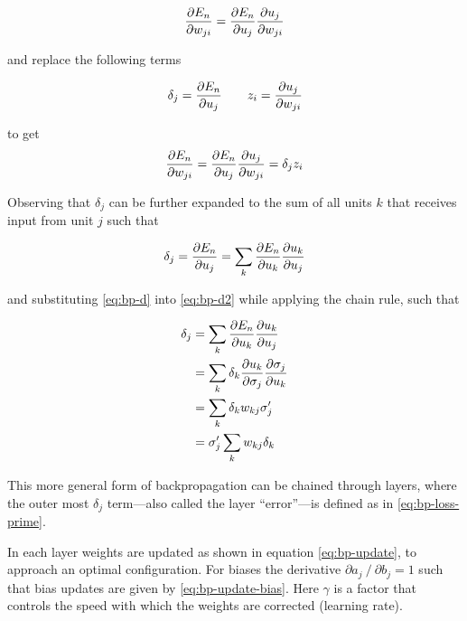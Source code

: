 \documentclass[report.tex]{subfiles}
\begin{document}
\begin{equation}
  {\partial E_n \over \partial w_{ji} } =
  { \partial E_n \over \partial u_j}
  {\partial u_j \over \partial w_{ji}}
  \label{eq:bp-chain}
\end{equation}

and replace the following terms

\begin{equation}
  \delta_j = 
  { \partial E_n \over \partial u_j}
  \qquad
  z_i = { \partial u_j \over \partial w_{ji}}
  \label{eq:bp-d}
\end{equation}

to get 
\begin{equation}
  {\partial E_n \over \partial w_{ji} } =
  { \partial E_n \over \partial u_j}
  {\partial u_j \over \partial w_{ji}} = 
  \delta_j z_i
  \label{eq:bp-chain2}
\end{equation}

Observing that $\delta_j$ can be further expanded to the sum of all units $k$
that receives input from unit $j$ such that

\begin{equation}
  \delta_j = {\partial E_n \over \partial u_j} =
  \sum_k {\partial E_n \over \partial u_k} 
  {\partial u_k \over \partial u_j}
  \label{eq:bp-d2}
\end{equation}

and substituting \ref{eq:bp-d} into \ref{eq:bp-d2} while applying the chain rule, such that

\begin{equation}
  \begin{split}
  \delta_j & = \sum_k {\partial E_n \over \partial u_k} 
   {\partial u_k \over \partial u_j} \\
   & = \sum_k \delta_k {\partial u_k \over \partial \sigma_j} {\partial \sigma_j \over \partial u_k} \\
   & = \sum_k \delta_k w_{kj} \sigma'_j \\
   & = \sigma'_j \sum_k w_{kj} \delta_k 
  \end{split}
  \label{eq:bp}
\end{equation}

This more general form of backpropagation can be chained through layers, where
the outer most $\delta_j$ term---also called the layer ``error''---is defined 
as in \ref{eq:bp-loss-prime}.

In each layer weights are updated as shown in equation \ref{eq:bp-update},
to approach an optimal configuration.
For biases the derivative $\partial a_j \mathbin{/} \partial b_j = 1$ such that bias
updates are given by \ref{eq:bp-update-bias}.
Here $\gamma$ is a factor that controls the speed with which the weights
are corrected (learning rate). 
\end{document}
